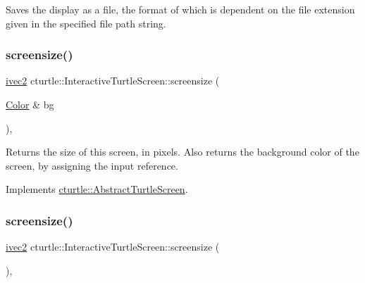 Saves the display as a file, the format of which is dependent on the file extension given in the specified file path string. \mbox{\label{classcturtle_1_1InteractiveTurtleScreen_a005b25693386718a6d80feeac677d255}} 
\subsubsection{\texorpdfstring{screensize()}{screensize()}\hspace{0.1cm}{\footnotesize\ttfamily [1/2]}}
{\footnotesize\ttfamily \hyperlink{structcturtle_1_1ivec2}{ivec2} cturtle\+::\+Interactive\+Turtle\+Screen\+::screensize (\begin{DoxyParamCaption}\item[{\hyperlink{classcturtle_1_1Color}{Color} \&}]{bg }\end{DoxyParamCaption})\hspace{0.3cm}{\ttfamily [inline]}, {\ttfamily [virtual]}}

Returns the size of this screen, in pixels. Also returns the background color of the screen, by assigning the input reference. 

Implements \hyperlink{classcturtle_1_1AbstractTurtleScreen}{cturtle\+::\+Abstract\+Turtle\+Screen}.

\mbox{\label{classcturtle_1_1InteractiveTurtleScreen_a1263d763eb9ef1b39f2e8c0a445d6a85}} 
\subsubsection{\texorpdfstring{screensize()}{screensize()}\hspace{0.1cm}{\footnotesize\ttfamily [2/2]}}
{\footnotesize\ttfamily \hyperlink{structcturtle_1_1ivec2}{ivec2} cturtle\+::\+Interactive\+Turtle\+Screen\+::screensize (\begin{DoxyParamCaption}{ }\end{DoxyParamCaption})\hspace{0.3cm}{\ttfamily [inline]}, {\ttfamily [virtual]}}

